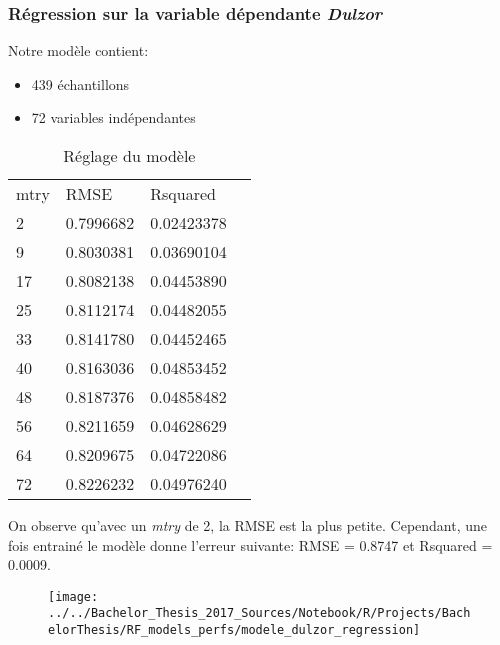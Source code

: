 



\newpage
\subsubsection{Régression sur la variable dépendante \textit{Dulzor}}
\noindent Notre modèle contient: 
\begin{itemize}
	\item 439 échantillons
	\item 72 variables indépendantes
\end{itemize}


\begin{table}[H]
	\centering
	\caption{Réglage du modèle}
	\label{RF_Dulzor_Resampling}
	\begin{tabular}{llll}
	mtry & RMSE      & Rsquared   \\
	2    & 0.7996682 & 0.02423378 \\
	9    & 0.8030381 & 0.03690104 \\
	17   & 0.8082138 & 0.04453890 \\
	25   & 0.8112174 & 0.04482055 \\
	33   & 0.8141780 & 0.04452465 \\
	40   & 0.8163036 & 0.04853452 \\
	48   & 0.8187376 & 0.04858482 \\
	56   & 0.8211659 & 0.04628629 \\
	64   & 0.8209675 & 0.04722086 \\
	72   & 0.8226232 & 0.04976240
	\end{tabular}
\end{table}

\noindent On observe qu'avec un \textit{mtry} de 2, la RMSE est la plus petite. Cependant, une fois entrainé le modèle donne l'erreur suivante: RMSE = 0.8747  et Rsquared = 0.0009. 

\begin{figure}[H]
	\centering
	\texttt{[image: ../../Bachelor\_Thesis\_2017\_Sources/Notebook/R/Projects/BachelorThesis/RF\_models\_perfs/modele\_dulzor\_regression]}
	\caption{}
	\label{fig:modeledulzorregression}
\end{figure}



